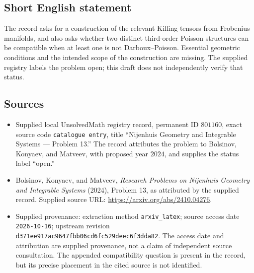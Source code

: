 \documentclass[11pt]{article}
\begin{document}
\subsection{Short English statement}
The record asks for a construction of the relevant Killing tensors from Frobenius manifolds, and also asks whether two distinct third-order Poisson structures can be compatible when at least one is not Darboux--Poisson. Essential geometric conditions and the intended scope of the construction are missing. The supplied registry labels the problem open; this draft does not independently verify that status.
\subsection{Sources}
\begin{itemize}
\item Supplied local UnsolvedMath registry record, permanent ID \(801160\), exact source code \texttt{catalogue entry}, title ``Nijenhuis Geometry and Integrable Systems --- Problem 13.'' The record attributes the problem to Bolsinov, Konyaev, and Matveev, with proposed year \(2024\), and supplies the status label ``open.''
\item Bolsinov, Konyaev, and Matveev, \emph{Research Problems on Nijenhuis Geometry and Integrable Systems} (2024), Problem 13, as attributed by the supplied record. Supplied source URL: \url{https://arxiv.org/abs/2410.04276}.
\item Supplied provenance: extraction method \texttt{arxiv\_latex}; source access date \texttt{2026-10-16}; upstream revision \texttt{d371ee917ac9647fbb06cd6fc529deec6f3dda82}. The access date and attribution are supplied provenance, not a claim of independent source consultation. The appended compatibility question is present in the record, but its precise placement in the cited source is not identified.
\end{itemize}
\end{document}
